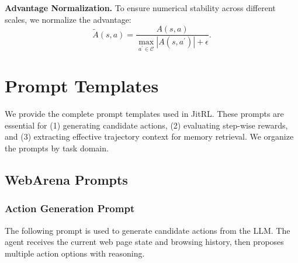 \textbf{Advantage Normalization.} To ensure numerical stability across different scales, we normalize the advantage:
\begin{equation}
    \tilde{A}(s,a)=\frac{A(s,a)}{\max_{a^{\prime}\in\mathcal{C}}|A(s,a^{\prime})| + \epsilon}.
    \label{eq:norm_advantage}
\end{equation}


\section{Prompt Templates}
\label{app:prompts}

We provide the complete prompt templates used in JitRL. These prompts are essential for (1) generating candidate actions, (2) evaluating step-wise rewards, and (3) extracting effective trajectory context for memory retrieval. We organize the prompts by task domain.

\subsection{WebArena Prompts}

\subsubsection{Action Generation Prompt}

The following prompt is used to generate candidate actions from the LLM. The agent receives the current web page state and browsing history, then proposes multiple action options with reasoning.

